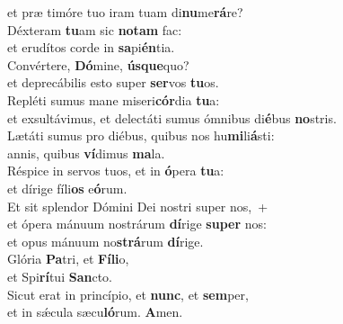 \oddverse et præ timóre tuo iram tuam di\textbf{nu}me\textbf{rá}re?\\
\evenverse Déxteram \textbf{tu}am sic \textbf{no}\textbf{tam} fac:~\*\\
\evenverse et erudítos corde in \textbf{sa}pi\textbf{én}tia.\\
\oddverse Convértere, \textbf{Dó}mine, \textbf{ús}\textbf{que}quo?~\*\\
\oddverse et deprecábilis esto super \textbf{ser}vos \textbf{tu}os.\\
\evenverse Repléti sumus mane miseri\textbf{cór}dia \textbf{tu}a:~\*\\
\evenverse et exsultávimus, et delectáti sumus ómnibus di\textbf{é}bus \textbf{no}stris.\\
\oddverse Lætáti sumus pro diébus, quibus nos hu\textbf{mi}li\textbf{á}sti:~\*\\
\oddverse annis, quibus \textbf{ví}dimus \textbf{ma}la.\\
\evenverse Réspice in servos tuos, et in \textbf{ó}pera \textbf{tu}a:~\*\\
\evenverse et dírige fíli\textbf{os} e\textbf{ó}rum.\\
\oddverse Et sit splendor Dómini Dei nostri super nos,~+\\
\oddverse  et ópera mánuum nostrárum \textbf{dí}rige \textbf{su}\textbf{per} nos:~\*\\
\oddverse et opus mánuum no\textbf{strá}rum \textbf{dí}rige.\\
\evenverse Glória \textbf{Pa}tri, et \textbf{Fí}\textbf{li}o,~\*\\
\evenverse et Spi\textbf{rí}tui \textbf{San}cto.\\
\oddverse Sicut erat in princípio, et \textbf{nunc}, et \textbf{sem}per,~\*\\
\oddverse et in sǽcula sæcu\textbf{ló}rum. \textbf{A}men.\\
